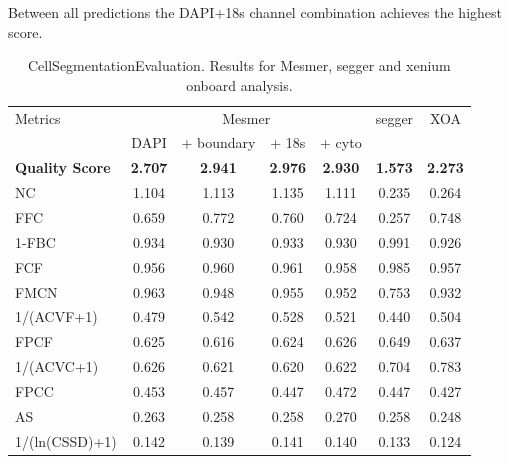 Between all predictions the DAPI+18s channel combination achieves the highest score.
\begin{table}
    \caption{CellSegmentationEvaluation. Results for Mesmer, segger and xenium onboard analysis.}
    \begin{tabular}{l| *{6}{c} }
         Metrics & \multicolumn{4}{c}{Mesmer} & segger & XOA \\
                 & DAPI & + boundary & + 18s & + cyto & & \\
         \hline
         \textbf{Quality Score} & \textbf{2.707} & \textbf{2.941} & \textbf{2.976} & \textbf{2.930} & \textbf{1.573} & \textbf{2.273} \\
         \hline
         NC & 1.104 & 1.113 & 1.135 & 1.111 & 0.235 & 0.264 \\
         \hline
         FFC & 0.659 & 0.772 & 0.760 & 0.724 & 0.257 & 0.748 \\
         1-FBC & 0.934 & 0.930 & 0.933 & 0.930 & 0.991 & 0.926 \\
         FCF & 0.956 &  0.960 & 0.961 & 0.958 & 0.985 & 0.957\\
         \hline 
         FMCN & 0.963 & 0.948 & 0.955 & 0.952 & 0.753 & 0.932 \\
         \hline
         1/(ACVF+1) & 0.479 & 0.542 & 0.528 & 0.521 & 0.440 & 0.504\\
         FPCF & 0.625 & 0.616 & 0.624 & 0.626 & 0.649 & 0.637\\
         \hline
         1/(ACVC+1)& 0.626 & 0.621 & 0.620 & 0.622 & 0.704 & 0.783 \\
         FPCC & 0.453 & 0.457 & 0.447 & 0.472 & 0.447 & 0.427\\
         AS & 0.263 & 0.258 & 0.258 & 0.270 & 0.258 & 0.248\\
         \hline
         1/(ln(CSSD)+1) & 0.142 & 0.139 & 0.141 & 0.140 & 0.133 & 0.124\\
    \end{tabular}
    \label{tab:PCA}
\end{table}
